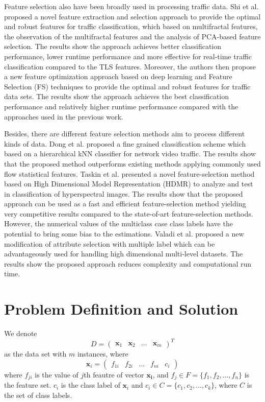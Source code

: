 \documentclass{ieeeaccess}
\theoremstyle{definition}
\begin{document}
Feature selection also have been broadly used in processing traffic data. Shi et al.\cite{Shi2017} proposed a novel feature extraction and selection approach to provide the optimal and robust features for traffic classification, which based on multifractal features, the observation of the multifractal features and the analysis of PCA-based feature selection. The results show the approach achieves better classification performance, lower runtime performance and more effective for real-time traffic classification compared to the TLS features. Moreover, the authors then propose a new feature optimization approach based on deep learning and Feature Selection (FS) techniques\cite{Shi2018} to provide the optimal and robust features for traffic data sets. The results show the approach achieves the best classification performance and relatively higher runtime performance compared with the approaches used in the previous work.

Besides, there are different feature selection methods aim to process different kinds of data. Dong et al.\cite{Dong2017} proposed a fine grained classification scheme which based on a hierarchical kNN classifier for network video traffic. The results show that the proposed method outperforms existing methods applying commonly used flow statistical features. Taskin et al.\cite{Taskin2017} presented a novel feature-selection method based on High Dimensional Model Representation (HDMR) to analyze and test in classification of hyperspectral images. The results show that the proposed approach can be used as a fast and efficient feature-selection method yielding very competitive results compared to the state-of-art feature-selection methods. However, the numerical values of the multiclass case class labels have the potential to bring some bias to the estimations. Valadi et al.\cite{Valadi2019} proposed a new modification of attribute selection with multiple label which can be advantageously used for handling high dimensional multi-level datasets. The results show the proposed approach reduces complexity and computational run time.

\section{Problem Definition and Solution}
\label{sec:problem}

We denote
$$
    D=\left(
        \begin{array}{llll}
            \bm{x}_1 & \bm{x}_2 & \ldots & \bm{x}_m
        \end{array}
    \right)^T
$$
as the data set with $m$ instances, where
$$
    \bm{x}_i = \left(
        \begin{array}{lllll}
            f_{1i} & f_{2i} & \ldots & f_{ni} & c_i
        \end{array}
    \right)
$$
where $f_{ji}$ is the value of $j$th feautre of vector $\bm{x_i}$, and $f_j \in F = \{f_1, f_2, \ldots, f_n\}$ is the feature set. $c_i$ is the class label of $\bm{x}_i$ and $c_i \in C = \{c_1, c_2, \ldots, c_k\}$, where $C$ is the set of class labels.
\end{document}
